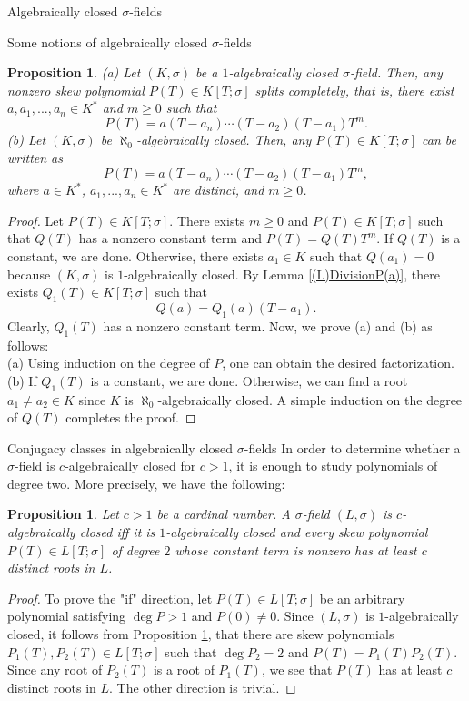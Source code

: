 \documentclass[11pt,a4paper]{article}
\theoremstyle{theorem}
\newtheorem{proposition}[theorem]{Proposition}
\numberwithin{equation}{section}
\newcommand{\s}{\sigma}
\begin{document}
\begin{section}{Algebraically closed $\s$-fields}
\begin{subsection}{Some notions of algebraically closed $\s$-fields}
	\begin{proposition}\label{(P)Factorizationinalgebraicallyclosed}
	(a) Let $(K,\s)$ be a $1$-algebraically closed $\s$-field. Then, any nonzero skew polynomial $P(T)\in K[T;\s]$ splits completely, that is, there exist $a,a_1,...,a_n\in K^*$ and $m\geq 0$ such that
	$$P(T)=a(T-a_n)\cdots(T-a_2)(T-a_1)T^m.$$
	(b) Let $(K,\s)$ be $\aleph_0$-algebraically closed. Then, any $P(T)\in K[T;\s]$ can be written as 
	$$P(T)=a(T-a_n)\cdots(T-a_2)(T-a_1)T^m,$$
	where $a\in K^*$, $a_1,...,a_n\in K^*$ are distinct, and $m\geq 0$.  
	\end{proposition}
	\begin{proof}
		Let $P(T)\in K[T;\s]$. There exists $m\geq 0$ and $P(T)\in K[T;\s]$ such that $Q(T)$ has a nonzero constant term and $P(T)=Q(T)T^m$. If $Q(T)$ is a constant, we are done. Otherwise, there exists $a_1\in K$ such that $Q(a_1)=0$ because $(K,\s)$ is $1$-algebraically closed. By Lemma \ref{(L)DivisionP(a)}, there exists $Q_1(T)\in K[T;\s]$ such that $$Q(a)=Q_1(a)(T-a_1).$$ Clearly, $Q_1(T)$ has a nonzero constant term. Now, we prove (a) and (b) as follows:\\
		(a) Using induction on the degree of $
		P$, one can obtain the desired factorization. \\
		(b) If $Q_1(T)$ is a constant, we are done. Otherwise, we can find a root $a_1\neq a_2\in K$ since $K$ is $\aleph_0$-algebraically closed. A simple induction on the degree of $Q(T)$ completes the proof. 
	\end{proof}

	
\end{subsection}

\begin{subsection}{Conjugacy classes in algebraically closed $\s$-fields} 
	In order to determine whether a $\s$-field is $c$-algebraically closed for $c>1$, it is enough to study polynomials of degree two. More precisely, we have the following: 
	\begin{proposition}\label{(P)2-algebraic}
		Let $c>1$ be a cardinal number. A $\s$-field $(L,\s)$ is $c$-algebraically closed iff it is  $1$-algebraically closed and every skew polynomial $P(T)\in L[T;\s]$ of degree $2$ whose constant term is nonzero has at least $c$ distinct roots in $L$. 
	\end{proposition}
	\begin{proof}
		To prove the "if" direction,  let $P(T)\in L[T;\s]$ be an arbitrary polynomial satisfying $\deg P>1$ and $P(0)\neq 0$. Since $(L,\s)$ is  $1$-algebraically closed, it follows from Proposition \ref{(P)Factorizationinalgebraicallyclosed}, that there are skew polynomials $P_1(T),P_2(T)\in  L[T;\s]$ such that $\deg P_2=2$ and $P(T)=P_1(T)P_2(T)$. Since any root of $P_2(T)$ is a root of $P_1(T)$, we see that $P(T)$ has at least $c$ distinct roots in $L$. The other direction is trivial. 
	\end{proof}
	

\end{subsection}
\end{section}
\end{document}
